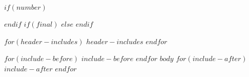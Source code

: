 $if(number)$
\setcounter{chapter}{$number$}
\addtocounter{chapter}{-1}
$endif$
$if(final)$
\DraftOff
$else$
\DraftOn
$endif$

$for(header-includes)$
$header-includes$
$endfor$

$for(include-before)$
$include-before$
$endfor$
$body$
$for(include-after)$
$include-after$
$endfor$
